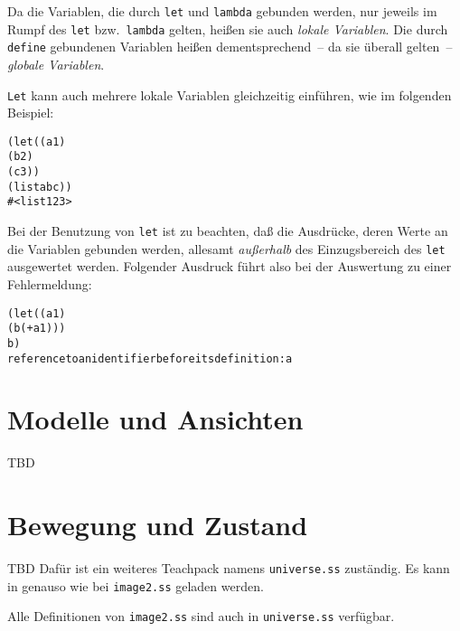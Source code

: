 Da die Variablen, die durch \texttt{let} und \texttt{lambda} gebunden
werden, nur jeweils im Rumpf des \texttt{let} bzw.\ \texttt{lambda}
gelten, heißen sie auch \textit{lokale Variablen}.  Die durch
\texttt{define} gebundenen Variablen heißen dementsprechend~-- da sie überall
gelten~-- \textit{globale Variablen}.

\texttt{Let} kann auch mehrere lokale Variablen
gleichzeitig einführen, wie im folgenden Beispiel:
%
\begin{alltt}
(let ((a 1)
      (b 2)
      (c 3))
  (list a b c))
\evalsto{} #<list 1 2 3>
\end{alltt}
%
Bei der Benutzung von \texttt{let} ist zu beachten, daß die Ausdrücke,
deren Werte an die Variablen gebunden werden, allesamt
\emph{außerhalb} des Einzugsbereich des \texttt{let} ausgewertet
werden.  Folgender Ausdruck führt also bei der Auswertung zu einer
Fehlermeldung:
%
\begin{alltt}
(let ((a 1)
      (b (+ a 1)))
  b)
\evalsto{} reference to an identifier before its definition: a
\end{alltt}
%

\begin{mantra}\label{mantra:local-variables}
  
\end{mantra}

\section{Modelle und Ansichten}


TBD

\section{Bewegung und Zustand}

TBD  Dafür ist ein weiteres Teachpack namens
\texttt{universe.ss} zuständig.  Es
kann in \drscheme{} genauso wie bei \texttt{image2.ss}
geladen werden.  

Alle Definitionen von
\texttt{image2.ss} sind auch in \texttt{universe.ss} verfügbar.

